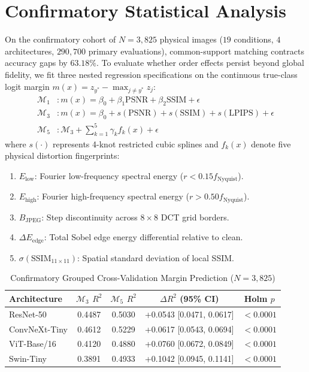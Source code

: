 \documentclass[10pt,journal,compsoc]{IEEEtran}
\begin{document}
\section{Confirmatory Statistical Analysis}
On the confirmatory cohort of $N = 3{,}825$ physical images ($19$ conditions, $4$ architectures, $290{,}700$ primary evaluations), common-support matching contracts accuracy gaps by $63.18\%$. To evaluate whether order effects persist beyond global fidelity, we fit three nested regression specifications on the continuous true-class logit margin $m(x) = z_{y^*} - \max_{j \ne y^*} z_j$:
\begin{align}
    \mathcal{M}_1 &: m(x) = \beta_0 + \beta_1 \text{PSNR} + \beta_2 \text{SSIM} + \epsilon \\
    \mathcal{M}_3 &: m(x) = \beta_0 + s(\text{PSNR}) + s(\text{SSIM}) + s(\text{LPIPS}) + \epsilon \\
    \mathcal{M}_5 &: \mathcal{M}_3 + \sum_{k=1}^5 \gamma_k f_k(x) + \epsilon
\end{align}
where $s(\cdot)$ represents 4-knot restricted cubic splines and $f_k(x)$ denote five physical distortion fingerprints:
\begin{enumerate}
    \item $E_{\text{low}}$: Fourier low-frequency spectral energy ($r < 0.15 f_{\text{Nyquist}}$).
    \item $E_{\text{high}}$: Fourier high-frequency spectral energy ($r > 0.50 f_{\text{Nyquist}}$).
    \item $B_{\text{JPEG}}$: Step discontinuity across $8 \times 8$ DCT grid borders.
    \item $\Delta E_{\text{edge}}$: Total Sobel edge energy differential relative to clean.
    \item $\sigma(\text{SSIM}_{11 \times 11})$: Spatial standard deviation of local SSIM.
\end{enumerate}

\begin{table}[t]
\caption{Confirmatory Grouped Cross-Validation Margin Prediction ($N = 3{,}825$)}
\label{tab:confirmatory}
\centering
\begin{tabular}{lcccc}
\toprule
Architecture & $\mathcal{M}_3$ $R^2$ & $\mathcal{M}_5$ $R^2$ & $\Delta R^2$ (95\% CI) & Holm $p$ \\
\midrule
ResNet-50 & 0.4487 & 0.5030 & +0.0543 [0.0471, 0.0617] & $< 0.0001$ \\
ConvNeXt-Tiny & 0.4612 & 0.5229 & +0.0617 [0.0543, 0.0694] & $< 0.0001$ \\
ViT-Base/16 & 0.4120 & 0.4880 & +0.0760 [0.0672, 0.0849] & $< 0.0001$ \\
Swin-Tiny & 0.3891 & 0.4933 & +0.1042 [0.0945, 0.1141] & $< 0.0001$ \\
\bottomrule
\end{tabular}
\end{table}
\end{document}
